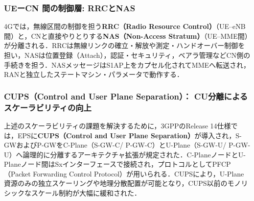 \subsubsection{UEーCN 間の制御層: RRCとNAS}
4Gでは，無線区間の制御を担う\textbf{RRC（Radio Resource Control）}（UE–eNB間）\cite{3GPP_TS36331}と，CNと直接やりとりする\textbf{NAS（Non-Access Stratum）}（UE–MME間）が分離される．RRCは無線リンクの確立・解放や測定・ハンドオーバー制御を担い，NASは位置登録（Attach），認証・セキュリティ，ベアラ管理などCN側の手続きを担う\cite{3GPP_TS24301}．NASメッセージはS1AP上をカプセル化されてMMEへ転送され，RANと独立したステートマシン・パラメータで動作する．

\subsubsection{CUPS（Control and User Plane Separation）： CU分離によるスケーラビリティの向上}
上述のスケーラビリティの課題を解決するために，3GPPのRelease 14仕様では，EPSに\textbf{CUPS（Control and User Plane Separation）}が導入され，S-GWおよびP-GWをC-Plane（S-GW-C/ P-GW-C）とU-Plane（S-GW-U/ P-GW-U）へ論理的に分離するアーキテクチャ拡張が規定された\cite{3GPP_TS23214}．C-PlaneノードとU-Planeノード間はSxインターフェースで接続され，プロトコルとしてPFCP（Packet Forwarding Control Protocol）が用いられる\cite{3GPP_TS29244}．CUPSにより，U-Plane資源のみの独立スケーリングや地理分散配置が可能となり，CUPS以前のモノリシックなスケール制約が大幅に緩和された．

